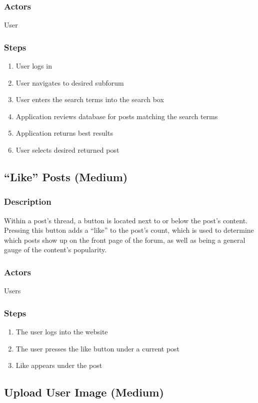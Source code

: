 \documentclass[12pt]{scrartcl}
\begin{document}
\subsubsection{Actors}
User

\subsubsection{Steps}
\begin{enumerate}
\item User logs in
\item User navigates to desired subforum
\item User enters the search terms into the search box
\item Application reviews database for posts matching the search terms
\item Application returns best results
\item User selects desired returned post
\end {enumerate}

\subsection{“Like” Posts (Medium)}
\subsubsection{Description}
Within a post’s thread, a button is located next to or below the post’s content. Pressing this button adds a “like” to the post’s count, which is used to
determine which posts show up on the front page of the forum, as well as being a general gauge of the content’s popularity.

\subsubsection{Actors}
Users
\subsubsection{Steps}

\begin{enumerate}
\item The user logs into the website
\item The user presses the like button under a current post
\item Like appears under the post 
\end{enumerate}


\subsection{Upload User Image (Medium)}
\end{document}
